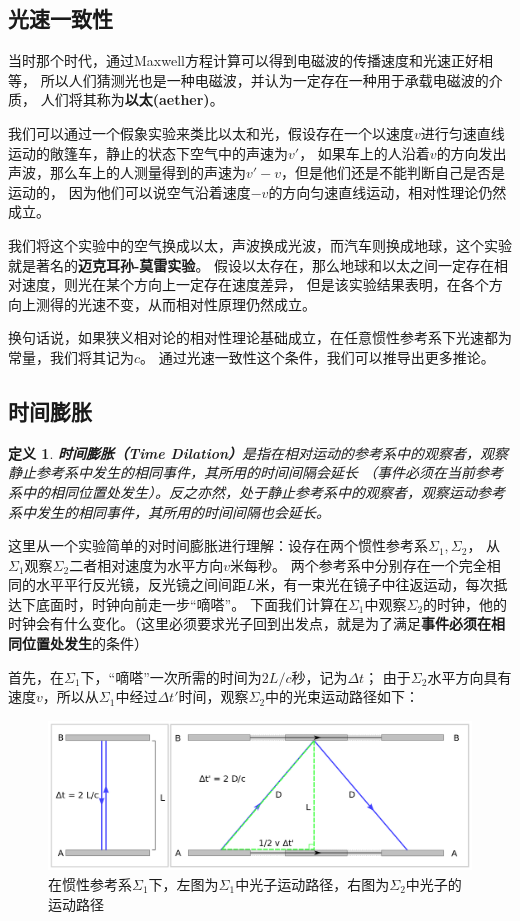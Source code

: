 \documentclass[12pt, a4paper, oneside]{ctexart}
\newtheorem{definition}{定义}[section]
\numberwithin{equation}{section}  %
\begin{document}
\subsection{光速一致性}
当时那个时代，通过Maxwell方程计算可以得到电磁波的传播速度和光速正好相等，
所以人们猜测光也是一种电磁波，并认为一定存在一种用于承载电磁波的介质，
人们将其称为\textbf{以太(aether)}。

我们可以通过一个假象实验来类比以太和光，假设存在一个以速度$v$进行匀速直线运动的敞篷车，静止的状态下空气中的声速为$v'$，
如果车上的人沿着$v$的方向发出声波，那么车上的人测量得到的声速为$v'-v$，但是他们还是不能判断自己是否是运动的，
因为他们可以说空气沿着速度$-v$的方向匀速直线运动，相对性理论仍然成立。

我们将这个实验中的空气换成以太，声波换成光波，而汽车则换成地球，这个实验就是著名的\textbf{迈克耳孙-莫雷实验}。
假设以太存在，那么地球和以太之间一定存在相对速度，则光在某个方向上一定存在速度差异，
但是该实验结果表明，在各个方向上测得的光速不变，从而相对性原理仍然成立。

换句话说，如果狭义相对论的相对性理论基础成立，在任意惯性参考系下光速都为常量，我们将其记为$c$。
通过光速一致性这个条件，我们可以推导出更多推论。

\subsection{时间膨胀}
\begin{definition}
    \textbf{时间膨胀（Time Dilation）}是指在相对运动的参考系中的观察者，观察静止参考系中发生的相同事件，其所用的时间间隔会延长
    （事件必须在当前参考系中的相同位置处发生）。反之亦然，处于静止参考系中的观察者，观察运动参考系中发生的相同事件，其所用的时间间隔也会延长。
\end{definition}
这里从一个实验简单的对时间膨胀进行理解：设存在两个惯性参考系$\Sigma_1,\Sigma_2$，
从$\Sigma_1$观察$\Sigma_2$二者相对速度为水平方向$v$米每秒。
两个参考系中分别存在一个完全相同的水平平行反光镜，反光镜之间间距$L$米，有一束光在镜子中往返运动，每次抵达下底面时，时钟向前走一步“嘀嗒”。
下面我们计算在$\Sigma_1$中观察$\Sigma_2$的时钟，他的时钟会有什么变化。（这里必须要求光子回到出发点，就是为了满足\textbf{事件必须在相同位置处发生}的条件）

首先，在$\Sigma_1$下，“嘀嗒”一次所需的时间为$2L/c$秒，记为$\Delta t$；
由于$\Sigma_2$水平方向具有速度$v$，所以从$\Sigma_1$中经过$\Delta t'$时间，观察$\Sigma_2$中的光束运动路径如下：
\begin{figure}[htbp]
    \centering
    \includegraphics[width=1.0\linewidth]{Time-dilation-002-mod.png}
    \caption{在惯性参考系$\Sigma_1$下，左图为$\Sigma_1$中光子运动路径，右图为$\Sigma_2$中光子的运动路径}
    \label{figure-time-dilation}
\end{figure}
\end{document}

